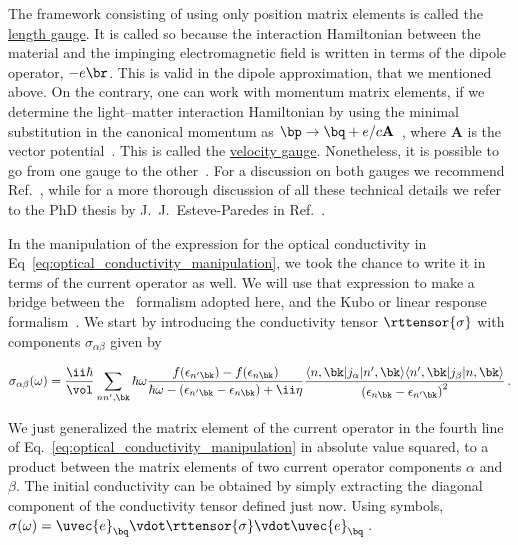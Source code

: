 The framework consisting of using only position matrix elements is called the \underline{length gauge}.
It is called so because the interaction Hamiltonian between the material and the impinging electromagnetic field is written in terms of the dipole operator, $-e \br$.
This is valid in the dipole approximation, that we mentioned above.
On the contrary, one can work with momentum matrix elements, if we determine the light--matter interaction Hamiltonian by using the minimal substitution in the canonical momentum as $\bp \to \bq + e/c \mathbf{A}$~\cite{goldstein:mechanics}, where $\mathbf{A}$ is the vector potential~\cite{Jackson:electrodynamics}.
This is called the \underline{velocity gauge}.
Nonetheless, it is possible to go from one gauge to the other~\cite{Ventura_Peres_2017,Ventura_Peres_2018}.
For a discussion on both gauges we recommend Ref.~\cite{Pedersen_2017}, while for a more thorough discussion of all these technical details we refer to the PhD thesis by J.~J.~Esteve-Paredes in Ref.~\cite{Esteve_PhD}.

In the manipulation of the expression for the optical conductivity in Eq~\eqref{eq:optical_conductivity_manipulation}, we took the chance to write it in terms of the current operator as well.
We will use that expression to make a bridge between the \rpa~formalism adopted here, and the Kubo or linear response formalism~\cite{Kubo_1957}.
We start by introducing the conductivity tensor $\rttensor{\sigma}$ with components $\sigma_{\alpha\beta}$ given by

\begin{equation}
    \label{eq:conductivity_tensor_components}
    \sigma_{\alpha\beta}(\omega)=\frac{\ii\hbar}{\vol}\sum_{nn',\bk}\hbar\omega\frac{f(\epsilon_{n' \bk})-f(\epsilon_{n \bk})}{\hbar \omega - (\epsilon_{n' \bk} - \epsilon_{n \bk}) + \ii \eta}\frac{\langle n,\bk|j_{\alpha}|n',\bk\rangle\langle n',\bk|j_{\beta}|n,\bk\rangle}{\left(\epsilon_{n \bk}-\epsilon_{n' \bk}\right)^{2}}\,.
\end{equation}

\noindent We just generalized the matrix element of the current operator in the fourth line of Eq.~\eqref{eq:optical_conductivity_manipulation} in absolute value squared, to a product between the matrix elements of two current operator components $\alpha$ and $\beta$.
The initial conductivity can be obtained by simply extracting the diagonal component of the conductivity tensor defined just now.
Using symbols, $\sigma(\omega) = \uvec{e}_{\bq} \vdot \rttensor{\sigma} \vdot \uvec{e}_{\bq}$\,.

